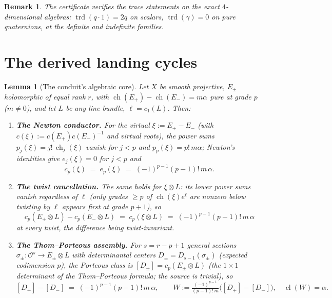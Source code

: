 \documentclass[11pt]{article}
\newcommand{\Oo}{\mathcal O}
\newcommand{\ch}{\operatorname{ch}}
\newcommand{\Cl}{\operatorname{cl}}
\newcommand{\trd}{\operatorname{trd}}
\newtheorem{lemma}[theorem]{Lemma}
\newtheorem{remark}[theorem]{Remark}
\begin{document}
\begin{remark}
The certificate verifies the trace statements on the exact
$4$-dimensional algebras: $\trd(q\cdot1)=2q$ on scalars,
$\trd(\gamma)=0$ on pure quaternions, at the definite and indefinite
families.
\end{remark}

\section{The derived landing cycles}

\begin{lemma}[The conduit's algebraic core]
\label{lem:conduit}
Let $X$ be smooth projective, $E_\pm$ holomorphic of equal rank $r$,
with $\ch(E_+)-\ch(E_-)=m\alpha$ \emph{pure} at grade $p$ ($m\neq0$),
and let $L$ be any line bundle, $\ell=c_1(L)$. Then:
\begin{enumerate}[label=(\alph*)]
\item \textbf{The Newton conductor.} For the virtual $\xi:=E_+-E_-$
(with $c(\xi):=c(E_+)c(E_-)^{-1}$ and virtual roots), the power sums
$p_j(\xi)=j!\,\ch_j(\xi)$ vanish for $j<p$ and $p_p(\xi)=p!\,m\alpha$;
Newton's identities give $e_j(\xi)=0$ for $j<p$ and
\[
c_p(\xi)\;=\;e_p(\xi)\;=\;(-1)^{p-1}(p-1)!\,m\,\alpha.
\]
\item \textbf{The twist cancellation.} The same holds for
$\xi\otimes L$: its lower power sums vanish \emph{regardless of
$\ell$} (only grades $\ge p$ of $\ch(\xi)e^\ell$ are nonzero below
twisting by $\ell$ appears first at grade $p{+}1$), so
\[
c_p(E_+\otimes L)-c_p(E_-\otimes L)\;=\;c_p(\xi\otimes L)
\;=\;(-1)^{p-1}(p-1)!\,m\,\alpha
\]
\emph{at every twist}, the difference being twist-invariant.
\item \textbf{The Thom--Porteous assembly.} For $s=r-p+1$ general
sections $\sigma_\pm\colon\Oo^s\to E_\pm\otimes L$ with determinantal
centers $D_\pm=D_{s-1}(\sigma_\pm)$ (expected codimension $p$), the
Porteous class is $[D_\pm]=c_p(E_\pm\otimes L)$ (the $1\times1$
determinant of the Thom--Porteous formula; the source is trivial), so
\[
[D_+]-[D_-]\;=\;(-1)^{p-1}(p-1)!\,m\,\alpha,
\qquad
W:=\tfrac{(-1)^{p-1}}{(p-1)!\,m}\bigl([D_+]-[D_-]\bigr),\quad
\Cl(W)=\alpha.
\]
\end{enumerate}
\end{lemma}
\end{document}
